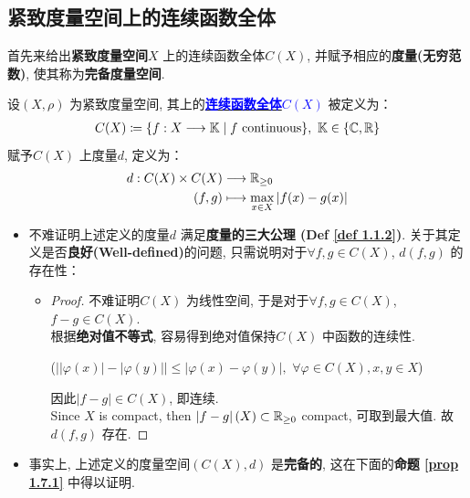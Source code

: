 \subsection{紧致度量空间上的连续函数全体}
	首先来给出\textbf{紧致度量空间$X$} 上的连续函数全体$C(X)$, 并赋予相应的\textbf{度量(无穷范数)}, 使其称为\textbf{完备度量空间}. 
	\begin{defn}\label{def 1.7.1}
		设$(X , \rho)$ 为紧致度量空间, 其上的\underline{\textcolor{blue}{\textbf{连续函数全体$C(X)$}}} 被定义为：
		\begin{align}
			C(X) \coloneqq \{ f : X \longrightarrow \mathbb{K} \mid f \,\, \text{continuous} \} , \,\, \mathbb{K} \in \{ \mathbb{C} , \mathbb{R} \}
		\end{align}
		赋予$C(X)$ 上度量$d$, 定义为：
		\begin{align}
			d : C(X) \times C(X) &\longrightarrow \mathbb{R}_{\geq 0} \\
			(f , g) &\longmapsto \max_{x \in X} \left| f(x) - g(x) \right|
		\end{align}
		
		\vspace{2em}
		
		\begin{rmk}
			\begin{itemize}
				\item 不难证明上述定义的度量$d$ 满足\textbf{度量的三大公理 (Def \ref{def 1.1.2})}. 关于其定义是否\textbf{良好(Well-defined)}的问题, 只需说明对于$\forall f , g \in C(X)$, $d(f , g)$ 的存在性：
				
				\vspace{3em}
				
				\begin{itemize}
					\item 
					\begin{proof}
						不难证明$C(X)$ 为线性空间, 于是对于$\forall f , g \in C(X)$, $f - g \in C(X)$. \\
						根据\textbf{绝对值不等式}, 容易得到绝对值保持$C(X)$ 中函数的连续性. 
						\begin{center}
							($\Big| \left| \varphi(x) \right| - \left| \varphi(y) \right| \Big| \leq \left| \varphi(x) - \varphi(y) \right| , \,\, \forall \varphi \in C(X) , x , y \in X$)
						\end{center}
						因此$\left| f - g \right| \in C(X)$, 即连续. \\
						Since $X$ is compact, then $\left| f - g \right| (X) \subset \mathbb{R}_{\geq 0}$ compact, 可取到最大值. 故$d(f , g)$ 存在.
					\end{proof}
				\end{itemize}
				
				\vspace{4em}
				
				\item 事实上, 上述定义的度量空间$(C(X) , d)$ 是\textbf{完备的}, 这在下面的\textbf{命题 \ref{prop 1.7.1}} 中得以证明.
			\end{itemize}
		\end{rmk}
	\end{defn}

